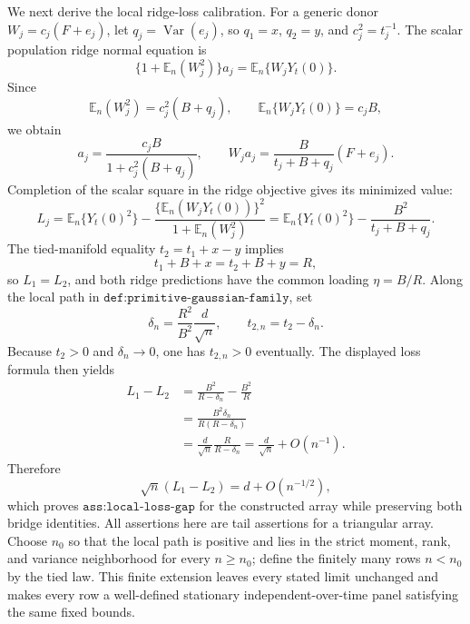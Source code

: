 We next derive the local ridge-loss calibration.  For a generic donor \(W_j=c_j(F+e_j)\), let \(q_j=\operatorname{Var}(e_j)\), so \(q_1=x\), \(q_2=y\), and \(c_j^2=t_j^{-1}\).  The scalar population ridge normal equation is
\[
 \{1+\mathbb E_n(W_j^2)\}a_j=\mathbb E_n\{W_jY_t(0)\}.
\]
Since
\[
 \mathbb E_n(W_j^2)=c_j^2(B+q_j),
 \qquad
 \mathbb E_n\{W_jY_t(0)\}=c_jB,
\]
we obtain
\[
 a_j=\frac{c_jB}{1+c_j^2(B+q_j)},
 \qquad
 W_ja_j=\frac{B}{t_j+B+q_j}(F+e_j).
\]
Completion of the scalar square in the ridge objective gives its minimized value:
\[
 L_j
 =\mathbb E_n\{Y_t(0)^2\}
  -\frac{\{\mathbb E_n(W_jY_t(0))\}^2}{1+\mathbb E_n(W_j^2)}
 =\mathbb E_n\{Y_t(0)^2\}-\frac{B^2}{t_j+B+q_j}.
\]
The tied-manifold equality \(t_2=t_1+x-y\) implies
\[
 t_1+B+x=t_2+B+y=R,
\]
so \(L_1=L_2\), and both ridge predictions have the common loading \(\eta=B/R\).  Along the local path in \(\texttt{def:primitive-gaussian-family}\), set
\[
 \delta_n=\frac{R^2}{B^2}\frac d{\sqrt n},
 \qquad
 t_{2,n}=t_2-\delta_n.
\]
Because \(t_2>0\) and \(\delta_n\to0\), one has \(t_{2,n}>0\) eventually.  The displayed loss formula then yields
\[
 \begin{aligned}
 L_1-L_2
 &=\frac{B^2}{R-\delta_n}-\frac{B^2}{R}\\
 &=\frac{B^2\delta_n}{R(R-\delta_n)}\\
 &=\frac d{\sqrt n}\frac{R}{R-\delta_n}
 =\frac d{\sqrt n}+O(n^{-1}).
 \end{aligned}
\]
Therefore
\[
 \sqrt n(L_1-L_2)=d+O(n^{-1/2}),
\]
which proves \(\texttt{ass:local-loss-gap}\) for the constructed array while preserving both bridge identities.
All assertions here are tail assertions for a triangular array.  Choose \(n_0\) so that the local path is positive and lies in the strict moment, rank, and variance neighborhood for every \(n\geq n_0\); define the finitely many rows \(n<n_0\) by the tied law.  This finite extension leaves every stated limit unchanged and makes every row a well-defined stationary independent-over-time panel satisfying the same fixed bounds.

